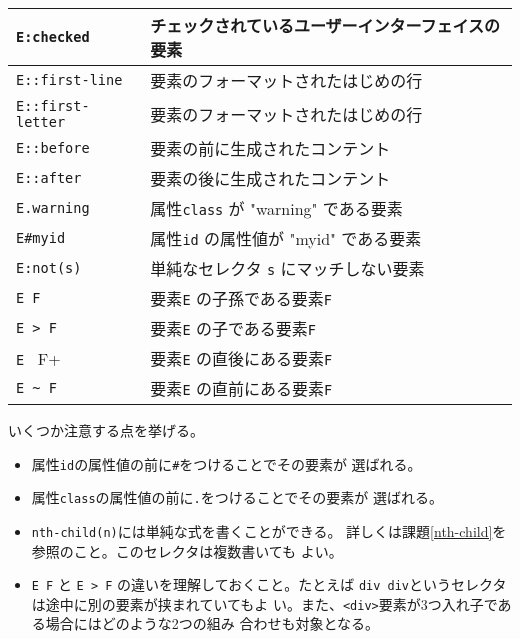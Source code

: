 \begin{longtable}{|m{13em}|m{}|}
\Verb+E:checked+&チェックされているユーザーインターフェイスの要素%
\\\hline
\Verb+E::first-line+&要素のフォーマットされたはじめの行%
\\\hline
\Verb+E::first-letter+&要素のフォーマットされたはじめの行%
\\\hline
\Verb+E::before+&要素の前に生成されたコンテント%
\\\hline
\Verb+E::after+&要素の後に生成されたコンテント%
\\\hline
\Verb+E.warning+&属性\texttt{class} が "warning" である要素%
\\\hline
\Verb+E#myid+&属性\texttt{id} の属性値が "myid" である要素%
\\\hline
\Verb+E:not(s)+&単純なセレクタ \texttt{s} にマッチしない要素%
\\\hline
\Verb+E F+&要素\texttt{E} の子孫である要素\texttt{F}%
\\\hline
\Verb+E > F+&要素\texttt{E} の子である要素\texttt{F}%
\\\hline
\Verb+E + F+&要素\texttt{E} の直後にある要素\texttt{F}%
\\\hline
\Verb+E ~ F+&要素\texttt{E} の直前にある要素\texttt{F}%
\\\hline
\end{longtable}

いくつか注意する点を挙げる。
\begin{itemize}
 \item 属性\texttt{id}の属性値の前に\texttt{\#}をつけることでその要素が
       選ばれる。
 \item 属性\texttt{class}の属性値の前に\texttt{.}をつけることでその要素が
       選ばれる。
 \item \texttt{nth-child(n)}には単純な式を書くことができる。
			 詳しくは課題\ref{nth-child}を参照のこと。このセレクタは複数書いても
       よい。
 \item \Verb+E F+ と \Verb+E > F+ の違いを理解しておくこと。たとえば
       \texttt{div div}というセレクタは途中に別の要素が挟まれていてもよ
       い。また、\texttt{<div>}要素が3つ入れ子である場合にはどのような2つの組み
       合わせも対象となる。
\end{itemize}


